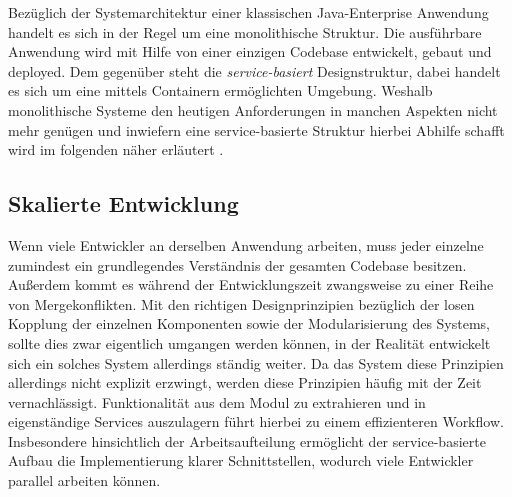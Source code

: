 



Bezüglich der Systemarchitektur einer klassischen Java-Enterprise Anwendung handelt es sich in der Regel um eine monolithische Struktur. Die ausführbare Anwendung wird mit Hilfe von einer einzigen Codebase entwickelt, gebaut und deployed. Dem gegenüber steht die \emph{service-basiert} Designstruktur, dabei handelt es sich um eine mittels Containern ermöglichten Umgebung. Weshalb monolithische Systeme den heutigen Anforderungen in manchen Aspekten nicht mehr genügen und inwiefern eine service-basierte Struktur hierbei Abhilfe schafft wird im folgenden näher erläutert \cite[Seite~42 ff.]{continuous-delivery}.

\subsection{Skalierte Entwicklung \checkmark}
Wenn viele Entwickler an derselben Anwendung arbeiten, muss jeder einzelne zumindest ein grundlegendes Verständnis der gesamten Codebase besitzen. Außerdem kommt es während der Entwicklungszeit zwangsweise zu einer Reihe von Mergekonflikten. Mit den richtigen Designprinzipien bezüglich der losen Kopplung der einzelnen Komponenten sowie der Modularisierung des Systems, sollte dies zwar eigentlich umgangen werden können, in der Realität entwickelt sich ein solches System allerdings ständig weiter. Da das System diese Prinzipien allerdings nicht explizit erzwingt, werden diese Prinzipien häufig mit der Zeit vernachlässigt. Funktionalität aus dem Modul zu extrahieren und in eigenständige Services auszulagern führt hierbei zu einem effizienteren Workflow. Insbesondere hinsichtlich der Arbeitsaufteilung ermöglicht der service-basierte Aufbau die Implementierung klarer Schnittstellen, wodurch viele Entwickler parallel arbeiten können.


